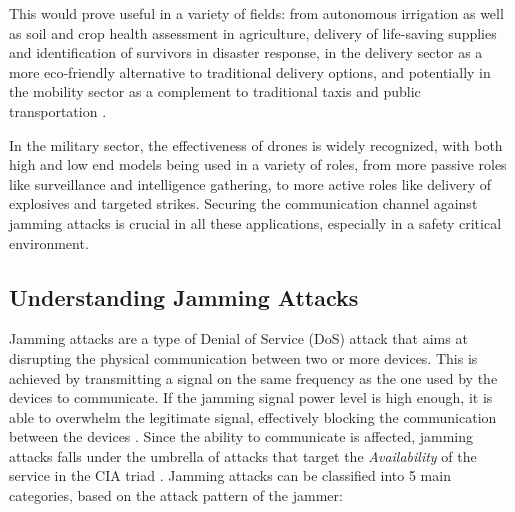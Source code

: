 \documentclass[futureinternet,article,submit,pdftex,moreauthors]{Definitions/mdpi}
\begin{document}
This would prove useful in a variety of fields: from autonomous irrigation as well as soil and crop health assessment in agriculture, 
delivery of life-saving supplies and identification of survivors in disaster response, in the delivery sector as a more eco-friendly alternative to traditional 
delivery options, and potentially in the mobility sector as a complement to traditional taxis and public transportation \cite{DroneCommHassija}. 

In the military sector, the effectiveness of drones is widely recognized, with both high and low end models being used in a variety of roles, from more passive roles like surveillance and intelligence gathering, to more active roles like
delivery of explosives and targeted strikes. Securing the communication channel against jamming attacks is crucial in all these applications, especially in a safety critical environment. 

\subsection{Understanding Jamming Attacks}

Jamming attacks are a type of Denial of Service (DoS) attack that aims at disrupting the physical communication between two or more devices. 
This is achieved by transmitting a signal on the same frequency as the one used by the devices to communicate. If the jamming signal power level is high enough, 
it is able to overwhelm the legitimate signal, effectively blocking the communication between the devices \cite{DroneCommHassija}. 
Since the ability to communicate is affected, jamming attacks falls under the umbrella of attacks that target the \textit{Availability} of the service in the CIA triad \cite{DataIntegrityCawthra}. 
Jamming attacks can be classified into 5 main categories, based on the attack pattern of the jammer: 
\end{document}
